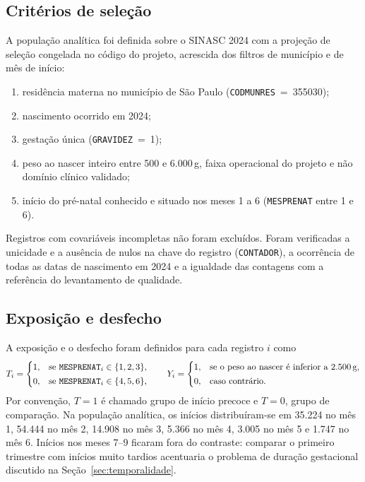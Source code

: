 \documentclass[11pt,a4paper]{article}
\newcommand{\campo}[1]{\texttt{#1}}       %
\begin{document}
\subsection{Critérios de seleção}

A população analítica foi definida sobre o SINASC 2024 com a projeção de seleção
congelada no código do projeto, acrescida dos filtros de município e de mês de início:

\begin{enumerate}
\item residência materna no município de São Paulo (\campo{CODMUNRES}~=~355030);
\item nascimento ocorrido em 2024;
\item gestação única (\campo{GRAVIDEZ}~=~1);
\item peso ao nascer inteiro entre 500 e 6.000\,g, faixa operacional do projeto e não
domínio clínico validado;
\item início do pré-natal conhecido e situado nos meses 1 a 6 (\campo{MESPRENAT} entre 1
e 6).
\end{enumerate}

Registros com covariáveis incompletas não foram excluídos. Foram verificadas a unicidade
e a ausência de nulos na chave do registro (\campo{CONTADOR}), a ocorrência de todas as
datas de nascimento em 2024 e a igualdade das contagens com a referência do levantamento
de qualidade.

\subsection{Exposição e desfecho}

A exposição e o desfecho foram definidos para cada registro $i$ como
\begin{equation}\label{eq:def}
T_i =
\begin{cases}
1, & \text{se } \campo{MESPRENAT}_i \in \{1,2,3\},\\[2pt]
0, & \text{se } \campo{MESPRENAT}_i \in \{4,5,6\},
\end{cases}
\qquad
Y_i =
\begin{cases}
1, & \text{se o peso ao nascer é inferior a 2.500\,g},\\[2pt]
0, & \text{caso contrário.}
\end{cases}
\end{equation}
Por convenção, $T=1$ é chamado grupo de início precoce e $T=0$, grupo de comparação. Na
população analítica, os inícios distribuíram-se em 35.224 no mês 1, 54.444 no mês 2,
14.908 no mês 3, 5.366 no mês 4, 3.005 no mês 5 e 1.747 no mês 6. Inícios nos meses 7--9
ficaram fora do contraste: comparar o primeiro trimestre com inícios muito tardios
acentuaria o problema de duração gestacional discutido na Seção~\ref{sec:temporalidade}.
\end{document}
